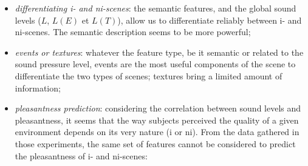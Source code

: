 \documentclass[12pt]{elsarticle}
\begin{document}
\begin{itemize}


\item \emph{differentiating i- and ni-scenes}: the semantic features, and the global sound levels ($L$, $L(E)$ et $L(T)$), allow us to differentiate reliably between i- and ni-scenes. The semantic description seems to be more powerful;
\item \emph{events or textures}: whatever the feature type, be it semantic or related to the sound pressure level, events are the most useful components of the scene to differentiate the two types of scenes; textures bring a limited amount of information;
\item \emph{pleasantness prediction}: considering the correlation between sound levels and pleasantness, it seems that the way subjects perceived the quality of a given environment depends on its very nature (i or ni). From the data gathered in those experiments, the same set of features cannot be considered to predict the pleasantness of i- and ni-scenes:

\begin{itemize}



\end{itemize}
\end{itemize}
\end{document}
